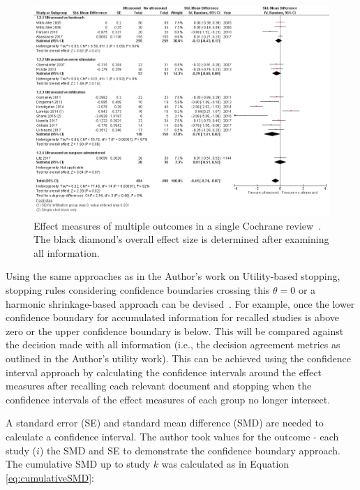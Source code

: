 \documentclass[10pt,oneside]{book}
\begin{document}
\begin{figure}
    \centering
    \includegraphics[width=1\linewidth]{Confirmation Review/images/cochrane_ultrasound.png}
    \caption{Effect measures of multiple outcomes in a single Cochrane review~\cite{norman_cochrane_2018}. The black diamond's overall effect size is determined after examining all information.\protect\footnotemark}
    \label{fig:cochrane_ultrasound}
\end{figure}


Using the same approaches as in the Author's work on Utility-based stopping, stopping rules considering confidence boundaries crossing this $\theta = 0$ or a harmonic shrinkage-based approach can be devised~\cite{lau_cumulative_1992}. For example, once the lower confidence boundary for accumulated information for recalled studies is above zero or the upper confidence boundary is below. This will be compared against the decision made with all information (i.e., the decision agreement metrics as outlined in the Author's utility work). This can be achieved using the confidence interval approach by calculating the confidence intervals around the effect measures after recalling each relevant document and stopping when the confidence intervals of the effect measures of each group no longer intersect.

A standard error (SE) and standard mean difference (SMD) are needed to calculate a confidence interval. The author took values for the outcome - each study ($i$) the SMD and SE to demonstrate the confidence boundary approach. The cumulative SMD up to study $k$ was calculated as in Equation \ref{eq:cumulativeSMD}:
\end{document}
